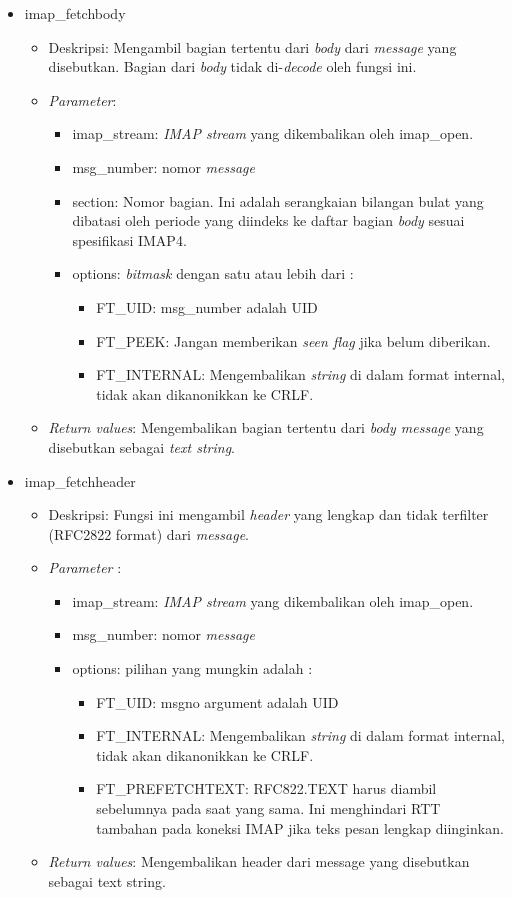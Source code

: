\begin{itemize}
\item imap\_fetchbody
\begin{itemize}
\item Deskripsi: Mengambil bagian tertentu dari \textit{body} dari \textit{message} yang disebutkan. Bagian dari \textit{body} tidak di-\textit{decode} oleh fungsi ini.
\item \textit{Parameter}:
\begin{itemize}
\item imap\_stream: \textit{IMAP stream} yang dikembalikan oleh imap\_open.
\item msg\_number: nomor \textit{message}
\item section: Nomor bagian. Ini adalah serangkaian bilangan bulat yang dibatasi oleh periode yang diindeks ke daftar bagian \textit{body} sesuai spesifikasi IMAP4.
\item options: \textit{bitmask} dengan satu atau lebih dari :
\begin{itemize}
\item FT\_UID: msg\_number adalah UID
\item FT\_PEEK: Jangan memberikan \textit{seen flag} jika belum diberikan.
\item FT\_INTERNAL: Mengembalikan \textit{string} di dalam format internal, tidak akan dikanonikkan ke CRLF.
\end{itemize}
\end{itemize}
\item \textit{Return values}: Mengembalikan bagian tertentu dari \textit{body message} yang disebutkan sebagai \textit{text string}.
\end{itemize}
 
\item imap\_fetchheader
\begin{itemize}
\item Deskripsi: Fungsi ini mengambil \textit{header} yang lengkap dan tidak terfilter (RFC2822 format) dari \textit{message}.
\item \textit{Parameter} :
\begin{itemize}
\item imap\_stream: \textit{IMAP stream} yang dikembalikan oleh imap\_open.
\item msg\_number: nomor \textit{message}
\item options: pilihan yang mungkin adalah :
\begin{itemize}
\item FT\_UID: msgno argument adalah UID
\item FT\_INTERNAL: Mengembalikan \textit{string} di dalam format internal, tidak akan dikanonikkan ke CRLF.
\item FT\_PREFETCHTEXT: RFC822.TEXT harus diambil sebelumnya pada saat yang sama. Ini menghindari RTT tambahan pada koneksi IMAP jika teks pesan lengkap diinginkan.
\end{itemize}
\end{itemize}
\item \textit{Return values}: Mengembalikan header dari message yang disebutkan sebagai text string.
\end{itemize}


\end{itemize}
